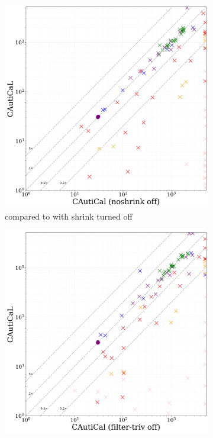 \begin{figure}[!ht]
    \centering
    \begin{subfigure}[t]{0.3\textwidth}
        \centering
        \includegraphics[width=\textwidth]{figs/globalnoshrink_heuristic_comparison.jpg}
        \caption{\tool compared to \tool with \textsf{shrink} turned off}
        \label{fig:global-no-shrink}
    \end{subfigure}
    \hfill
    \begin{subfigure}[t]{0.3\textwidth}
        \centering
        \includegraphics[width=\textwidth]{figs/globaldontfilter_heuristic_comparison.jpg}

\end{subfigure}
\end{figure}
